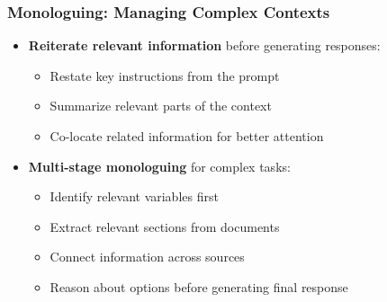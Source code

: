 \begin{frame}
    \frametitle{Monologuing: Managing Complex Contexts}
    
    \begin{itemize}
        \item \textbf{Reiterate relevant information} before generating responses:
        \begin{itemize}
            \item Restate key instructions from the prompt
            \item Summarize relevant parts of the context
            \item Co-locate related information for better attention
        \end{itemize}
        \item \textbf{Multi-stage monologuing} for complex tasks:
        \begin{itemize}
            \item Identify relevant variables first
            \item Extract relevant sections from documents
            \item Connect information across sources
            \item Reason about options before generating final response
        \end{itemize}
    \end{itemize}
    
    \begin{center}
    \end{center}
\end{frame}

